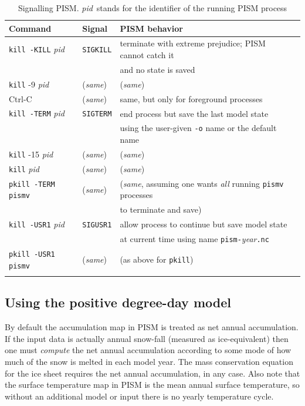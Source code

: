 \documentclass[11pt,final]{amsart}
\begin{document}
\newcommand\pid{\textsl{pid}}
\newcommand\same{(\textsl{same})}
\begin{table}[ht]
\caption{Signalling PISM.  \pid~stands for the identifier of the running PISM process}\label{tab:signals}
\begin{tabular}{@{}llll}\hline
\textbf{Command}\phantom{bobbob} & \textbf{Signal}\phantom{bobbob} & \textbf{PISM behavior} \\ \hline
\texttt{kill -KILL} \pid & \texttt{SIGKILL} & terminate with extreme prejudice; PISM cannot catch it \\
 & & and no state is saved \\
\texttt{kill} -9 \pid & \same & \same \\
Ctrl-C & \same & same, but only for foreground processes  \\ \hline
\texttt{kill -TERM} \pid & \texttt{SIGTERM} & end process but save the last model state \\
 &  & using the user-given \verb|-o| name or the default name \\
\texttt{kill} -15 \pid & \same & \same \\
\texttt{kill} \pid & \same & \same \\
\texttt{pkill -TERM pismv} & \same & (\emph{same}, assuming one wants \emph{all} running \verb|pismv| processes \\ 
 &  & to terminate and save) \\ \hline
\texttt{kill -USR1} \pid & \texttt{SIGUSR1} & allow process to continue but save model state \\
 &  & at current time using name \texttt{pism-}\textsl{year}\texttt{.nc} \\
\texttt{pkill -USR1 pismv} & \same & (as above for \verb|pkill|) \\
\hline\normalsize
\end{tabular}
\end{table}


\subsection{Using the positive degree-day model}  \label{subsect:pdd}  By default the accumulation map in PISM is treated as net annual accumulation.  If the input data is actually annual snow-fall (measured as ice-equivalent) then one must \emph{compute} the net annual accumulation according to some mode of how much of the snow is melted in each model year.  The mass conservation equation for the ice sheet requires the net annual accumulation, in any case.  Also note that the surface temperature map in PISM is the mean annual surface temperature, so without an additional model or input there is no yearly temperature cycle.
\end{document}
